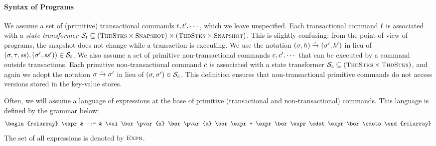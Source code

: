 \paragraph{\textbf{Syntax of Programs}}
We assume a set of (primitive) transactional commands $t,t',\cdots$, which 
we leave unspecified. Each transactional command $t$ is associated with a \emph{state transformer} 
$\mathcal{S}_t \subseteq (\ThdStacks \times \Heaps) \times (\ThdStacks \times \Heaps)$. 
\ac{This is slightly confusing: from the point of view of programs, the snapshot does not change 
while a transaction is executing.}
We use the notation $(\thdstack, \heap) \toT{t} (\thdstack' , \heap')$ 
in lieu of $(\sigma, \tau, \mathit{ss}), (\sigma', \mathit{ss}' )) \in \mathcal{S}_t$. 
We also assume a set of primitive non-transactional commands $c, c',\cdots$ 
that can be executed by a command outside transactions. Each primitive non-transactional 
command $c$ is associated with a state transformer $\mathcal{S}_c \subseteq 
(\ThdStacks \times \ThdStacks)$, and again we adopt the notation $\thdstack \toT{c} 
\thdstack'$ in lieu of $(\sigma, \sigma') \in \mathcal{S}_c$.
This definition ensures that non-transactional primitive commands do not access 
versions stored in  the key-value stores.

Often, we will assume a language of expressions at the base of primitive (transactional and non-transactional) 
commands. This language is defined by the grammar below: 
\[
\begin{rclarray}
\expr & ::= & \val \bor \pvar{x} \bor \pvar{a} \bor \expr + \expr \bor \expr \cdot \expr \bor \cdots
\end{rclarray}
\]
The set of all expressions is denoted by $\Expr$.

